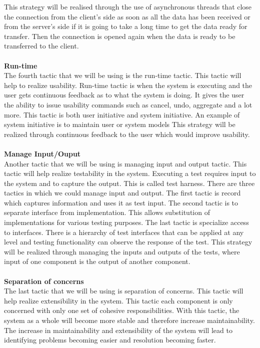 \documentclass[a4paper]{article}
\begin{document}
This strategy will be realised through the use of asynchronous threads that close the connection from the client’s side as soon as all the data has been received or from the server’s side if it is going to take a long time to get the data ready for transfer. Then the connection is opened again when the data is ready to be transferred to the client. 
\\
\\\textbf{Run-time}
\\The fourth tactic that we will be using is the run-time tactic. This tactic will help to realize usability. Run-time tactic is when the system is executing and the user gets continuous feedback as to what the system is doing. It gives the user the ability to issue usability commands such as cancel, undo, aggregate and a lot more.  This tactic is both user initiative and system initiative. An example of system initiative is to maintain user or system models
This strategy will be realized through continuous feedback to the user which would improve usability.
\\
\\\textbf{Manage Input/Ouput}
\\Another tactic that we will be using is managing input and output tactic. This tactic will help realize testability in the system. Executing a test requires input to the system and to capture the output. This is called test harness. There are three tactics in which we could manage input and output. The first tactic is record which captures information and uses it as test input. The second tactic is to separate interface from implementation. This allows substitution of implementations for various testing purposes. The last tactic is specialize access to interfaces. There is a hierarchy of test interfaces that can be applied at any level and testing functionality can observe the response of the test.
This strategy will be realized through managing the inputs and outputs of the tests, where input of one component is the output of another component.
\\
\\\textbf{Separation of concerns}
\\The last tactic that we will be using is separation of concerns. This tactic will help realize extensibility in the system. This tactic each component is only concerned with only one set of cohesive responsibilities. With this tactic, the system as a whole will become more stable and therefore increase maintainability. The increase in maintainability and extensibility of the system will lead to identifying problems becoming easier and resolution becoming faster.
\end{document}
